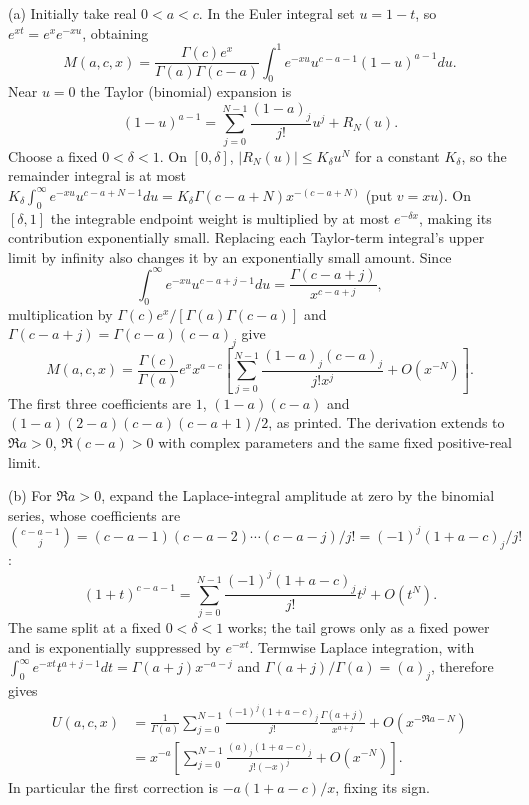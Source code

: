 (a) Initially take real $0<a<c$.  In the Euler integral set
$u=1-t$, so $e^{xt}=e^xe^{-xu}$, obtaining
\[
M(a,c,x)=\frac{\Gamma(c)e^x}{\Gamma(a)\Gamma(c-a)}
 \int_0^1e^{-xu}u^{c-a-1}(1-u)^{a-1}du.
\]
Near $u=0$ the Taylor (binomial) expansion is
\[
(1-u)^{a-1}=\sum_{j=0}^{N-1}\frac{(1-a)_j}{j!}u^j+R_N(u).
\]
Choose a fixed $0<\delta<1$.  On $[0,\delta]$,
$|R_N(u)|\le K_\delta u^N$ for a constant $K_\delta$, so the
remainder integral is at most
$K_\delta\int_0^\infty e^{-xu}u^{c-a+N-1}du
=K_\delta\Gamma(c-a+N)x^{-(c-a+N)}$ (put $v=xu$).  On $[\delta,1]$
the integrable endpoint weight is multiplied by at most
$e^{-\delta x}$, making its contribution exponentially small.
Replacing each Taylor-term integral's upper limit by infinity
also changes it by an exponentially small amount.  Since
\[
\int_0^\infty e^{-xu}u^{c-a+j-1}du
 =\frac{\Gamma(c-a+j)}{x^{c-a+j}},
\]
multiplication by $\Gamma(c)e^x/[\Gamma(a)\Gamma(c-a)]$ and
$\Gamma(c-a+j)=\Gamma(c-a)(c-a)_j$ give
\[
\boxed{M(a,c,x)=\frac{\Gamma(c)}{\Gamma(a)}e^xx^{a-c}
 \left[\sum_{j=0}^{N-1}\frac{(1-a)_j(c-a)_j}{j!x^j}
                  +O(x^{-N})\right]}.
\]
The first three coefficients are
$1$, $(1-a)(c-a)$ and
$(1-a)(2-a)(c-a)(c-a+1)/2$, as printed.
The derivation extends to $\Re a>0$, $\Re(c-a)>0$ with
complex parameters and the same fixed positive-real limit.

(b) For $\Re a>0$, expand the Laplace-integral amplitude at zero
by the binomial series, whose coefficients are
$\binom{c-a-1}j=(c-a-1)(c-a-2)\cdots(c-a-j)/j!
=(-1)^j(1+a-c)_j/j!$:
\[
(1+t)^{c-a-1}
 =\sum_{j=0}^{N-1}\frac{(-1)^j(1+a-c)_j}{j!}t^j+O(t^N).
\]
The same split at a fixed $0<\delta<1$ works; the tail grows only
as a fixed power and is exponentially suppressed by $e^{-xt}$.
Termwise Laplace integration, with
$\int_0^\infty e^{-xt}t^{a+j-1}dt=\Gamma(a+j)x^{-a-j}$ and
$\Gamma(a+j)/\Gamma(a)=(a)_j$, therefore gives
\begin{align*}
U(a,c,x)
 &=\frac1{\Gamma(a)}\sum_{j=0}^{N-1}
   \frac{(-1)^j(1+a-c)_j}{j!}
           \frac{\Gamma(a+j)}{x^{a+j}}+O(x^{-\Re a-N})\\
 &=\boxed{x^{-a}\left[\sum_{j=0}^{N-1}
        \frac{(a)_j(1+a-c)_j}{j!(-x)^j}+O(x^{-N})\right]}.
\end{align*}
In particular the first correction is $-a(1+a-c)/x$, fixing
its sign.

